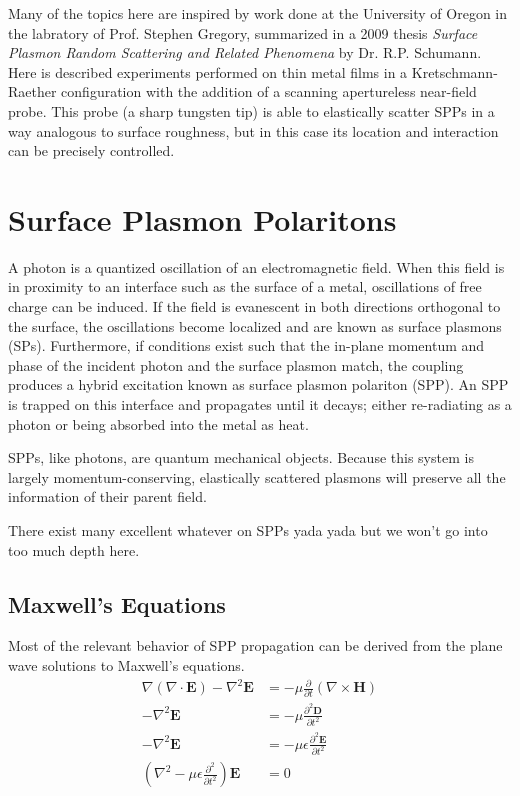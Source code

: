 \documentclass[a4paper,titlepage,onecolumn]{report}
\begin{document}
Many of the topics here are inspired by work done at the University of
Oregon in the labratory of Prof. Stephen Gregory, summarized in a 2009 thesis
{\it Surface Plasmon Random Scattering and Related Phenomena}
\cite{schumann2009surface} by Dr. R.P. Schumann.  Here is described experiments
performed on thin metal films in a Kretschmann-Raether configuration with
the addition of a scanning apertureless near-field probe.  This probe (a
sharp tungsten tip) is able to elastically scatter SPPs in a way analogous
to surface roughness, but in this case its location and interaction can be
precisely controlled.  

\section{Surface Plasmon Polaritons}
A photon is a quantized oscillation of an electromagnetic field.  When this
field is in proximity to an interface such as the surface
of a metal, oscillations of free charge can be induced.  If the field is
evanescent in both directions orthogonal to the surface, the oscillations
become localized and are known as surface plasmons (SPs).  Furthermore, if
conditions exist such that the in-plane momentum and phase of the incident
photon and the surface plasmon match, the coupling produces a hybrid
excitation known as surface plasmon polariton (SPP).  An SPP is trapped on
this interface and propagates until it decays; either re-radiating as a
photon or being absorbed into the metal as heat.

SPPs, like photons, are quantum mechanical objects.  Because this system is
largely momentum-conserving, elastically scattered plasmons will preserve
all the information of their parent field.

There exist many excellent whatever on SPPs yada yada but we won't go into too much depth here.
\subsection{Maxwell's Equations}
Most of the relevant behavior of SPP propagation can be derived from the plane wave solutions to Maxwell's equations.
\begin{align}
\nabla\left(\nabla\cdot\mathbf{E}\right)-\nabla^2\mathbf{E}
&=-\mu\frac{\partial}{\partial t}\left(\nabla \times \mathbf{H}\right)\\
-\nabla^2\mathbf{E}&=-\mu\frac{\partial^2 \mathbf{D}}{\partial t^2}\\
-\nabla^2\mathbf{E}&=-\mu\epsilon\frac{\partial^2 \mathbf{E}}{\partial t^2}\\
\left(\nabla^2-\mu\epsilon\frac{\partial^2}{\partial t^2}\right)\mathbf{E}&=0
\label{eqn:ewe}
\end{align}
\end{document}
